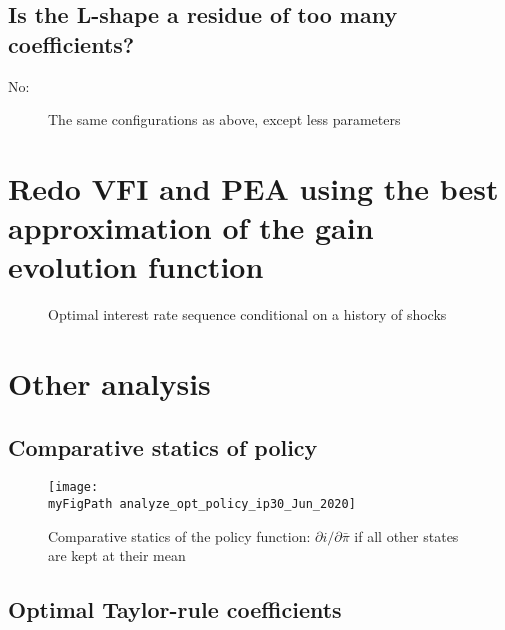 \documentclass[11pt]{article}
\def \myFigPath {../../figures/}
\renewcommand{\[}{\begin{equation}}
\renewcommand{\]}{\end{equation}}
\def\mySmallFigScale{0.22}
\def\mySmallerFigScale{0.18}
\def\myTinyFigScale{0.16}
\begin{document}
\subsection{Is the L-shape a residue of too many coefficients?}
No:
\begin{figure}[h!]
\hfill
{}
\caption{The same configurations as above, except less parameters}
\floatfoot{}
\end{figure}

\newpage
\section{Redo VFI and PEA using the best approximation of the gain evolution function}

\begin{figure}[h!]
\hfill
{}
\caption{Optimal interest rate sequence conditional on a history of shocks}
\end{figure}

\section{Other analysis}
\subsection{Comparative statics of policy}
\begin{figure}[h!]
\texttt{[image: \\myFigPath analyze\_opt\_policy\_ip30\_Jun\_2020]}
\caption{Comparative statics of the policy function: $\partial i / \partial \bar{\pi}$ if all other states are kept at their mean}
\end{figure}

\newpage
\subsection{Optimal Taylor-rule coefficients}
\end{document}
